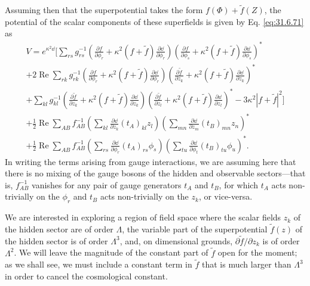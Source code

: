 Assuming then that the superpotential takes the form
\(f(\Phi)+\widetilde f(Z)\), the potential of the scalar components of these
superfields is given by Eq. \eqref{eq:31.6.71} as
\begin{multline}
  V=e^{\kappa^2\dd}\Biggl[
  \sum_{rs}g_{rs}^{-1}
  \left(
    \frac{\partial f}{\partial\phi_r}
    +\kappa^2(f+\widetilde f)\frac{\partial \dd}{\partial\phi_r}
  \right)
  \left(
    \frac{\partial f}{\partial\phi_s}
    +\kappa^2(f+\widetilde f)\frac{\partial \dd}{\partial\phi_s}
  \right)^*
  \\
  +2\operatorname{Re}\sum_{rk}g_{rk}^{-1}
  \left(
    \frac{\partial f}{\partial\phi_r}
    +\kappa^2(f+\widetilde f)\frac{\partial \dd}{\partial\phi_r}
  \right)
  \left(
    \frac{\partial\widetilde f}{\partial z_k}
    +\kappa^2(f+\widetilde f)\frac{\partial \dd}{\partial z_k}
  \right)^*
  \\
  +\sum_{kl}g_{kl}^{-1}
  \left(
    \frac{\partial\widetilde f}{\partial z_k}
    +\kappa^2(f+\widetilde f)\frac{\partial \dd}{\partial z_k}
  \right)
  \left(
    \frac{\partial\widetilde f}{\partial z_l}
    +\kappa^2(f+\widetilde f)\frac{\partial \dd}{\partial z_l}
  \right)^*
  -3\kappa^2|f+\widetilde f|^2
  \Biggr]
  \\
  +\frac12\operatorname{Re}\sum_{AB}f_{AB}^{-1}
  \left(
    \sum_{kl}\frac{\partial \dd}{\partial z_k}(t_A)_{kl}z_l
  \right)
  \left(
    \sum_{mn}\frac{\partial \dd}{\partial z_m}(t_B)_{mn}z_n
  \right)^*
  \\
  +\frac12\operatorname{Re}\sum_{AB}f_{AB}^{-1}
  \left(
    \sum_{rs}\frac{\partial \dd}{\partial\phi_r}(t_A)_{rs}\phi_s
  \right)
  \left(
    \sum_{tu}\frac{\partial \dd}{\partial\phi_t}(t_B)_{tu}\phi_u
  \right)^* .
  \tag{31.7.2}\label{eq:31.7.2}
\end{multline}
In writing the terms arising from gauge interactions, we are assuming here
that there is no mixing of the gauge bosons of the hidden and observable
sectors---that is, \(f_{AB}^{-1}\) vanishes for any pair of gauge generators
\(t_A\) and \(t_B\), for which \(t_A\) acts non-trivially on the \(\phi_r\)
and \(t_B\) acts non-trivially on the \(z_k\), or vice-versa.

We are interested in exploring a region of field space where the scalar
fields \(z_k\) of the hidden sector are of order \(\Lambda\), the variable
part of the superpotential \(\widetilde f(z)\) of the hidden sector is of
order \(\Lambda^3\), and, on dimensional grounds,
\(\partial\widetilde f/\partial z_k\) is of order \(\Lambda^2\). We will
leave the magnitude of the constant part of \(\widetilde f\) open for the
moment; as we shall see, we must include a constant term in
\(\widetilde f\) that is much larger than \(\Lambda^3\) in order to cancel
the cosmological constant.

